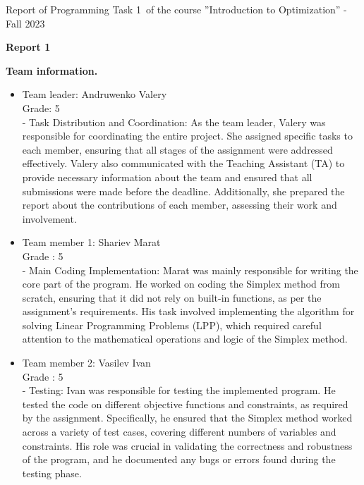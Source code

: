 \documentclass[12pt, legalpaper]{exam}
\newcommand{\course}{Introduction to Optimization}
\newcommand{\term}{Fall 2023}
\newcommand{\examnum}{Report of Programming Task 1}
\begin{document}
\noindent \examnum \, of the  course ''\course'' - \term


\noindent
{}




\vspace{12pt}
\begin{center}
    \textbf{Report 1}
\end{center}

\vspace{12pt}

\noindent  \textbf{Team information.}

\begin{itemize}
    \item Team leader: Andruwenko Valery 
    \\Grade: 5
    \\ - Task Distribution and Coordination: As the team leader, Valery was responsible for coordinating the entire project. She assigned specific tasks to each member, ensuring that all stages of the assignment were addressed effectively. Valery also communicated with the Teaching Assistant (TA) to provide necessary information about the team and ensured that all submissions were made before the deadline. Additionally, she prepared the report about the contributions of each member, assessing their work and involvement.
    \item Team member 1: Shariev Marat 
    \\Grade : 5
    \\ - Main Coding Implementation: Marat was mainly responsible for writing the core part of the program. He worked on coding the Simplex method from scratch, ensuring that it did not rely on built-in functions, as per the assignment's requirements. His task involved implementing the algorithm for solving Linear Programming Problems (LPP), which required careful attention to the mathematical operations and logic of the Simplex method.
    \item Team member 2: Vasilev Ivan
    \\ Grade : 5
    \\- Testing: Ivan was responsible for testing the implemented program. He tested the code on different objective functions and constraints, as required by the assignment. Specifically, he ensured that the Simplex method worked across a variety of test cases, covering different numbers of variables and constraints. His role was crucial in validating the correctness and robustness of the program, and he documented any bugs or errors found during the testing phase.

\end{itemize}
\end{document}
